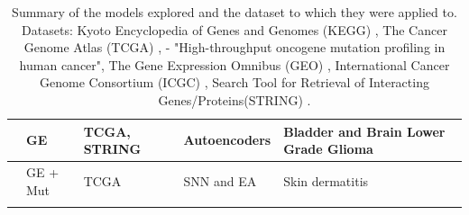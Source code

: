{\begin{longtable}{|p{3cm}|p{1.8cm}|p{2.2cm}|p{2.8cm}|p{3.5cm}|}
\citet{Ma2019-hk} & GE & TCGA, STRING & Autoencoders &  Bladder and Brain Lower Grade Glioma \\ \hline
\citet{Capecci2020-uj} & GE + Mut & TCGA & SNN and EA & Skin dermatitis  \\ \hline
\caption[Summary of the models explored and the datasets used]{Summary of the models explored and the dataset to which they were applied to. Datasets: Kyoto Encyclopedia of Genes and Genomes (KEGG) \cite{Kanehisa2017-wj}, The Cancer Genome Atlas (TCGA) \cite{TCGA2018-rz}, \citet{Thomas2007-yj} - "High-throughput oncogene mutation profiling in human cancer", The Gene Expression Omnibus (GEO) \cite{Clough2016-zc, Davis2007-at}, International Cancer Genome Consortium (ICGC) \cite{International_Cancer_Genome_Consortium2010-ca}, Search Tool for Retrieval of Interacting Genes/Proteins(STRING) \cite{Szklarczyk2019-pu}.}
\label{tab:approaches}
\end{longtable}
}









